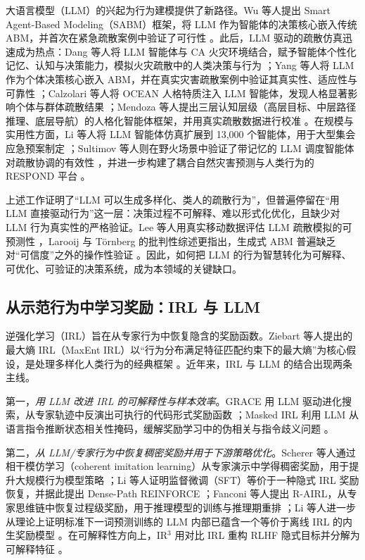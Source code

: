 \documentclass[UTF8,zihao=-4]{ctexart}
\begin{document}
大语言模型（LLM）的兴起为行为建模提供了新路径。Wu 等人提出 Smart Agent-Based Modeling（SABM）框架，将 LLM 作为智能体的决策核心嵌入传统 ABM，并首次在紧急疏散案例中验证了可行性 \cite{wu2023sabm}。此后，LLM 驱动的疏散仿真迅速成为热点：Dang 等人将 LLM 智能体与 CA 火灾环境结合，赋予智能体个性化记忆、认知与决策能力，模拟火灾疏散中的人类决策与行为 \cite{dang2025llmfire}；Yang 等人将 LLM 作为个体决策核心嵌入 ABM，并在真实灾害疏散案例中验证其真实性、适应性与可靠性 \cite{yang2026think}；Calzolari 等人将 OCEAN 人格特质注入 LLM 智能体，发现人格显著影响个体与群体疏散结果 \cite{calzolari2026personality}；Mendoza 等人提出三层认知层级（高层目标、中层路径推理、底层导航）的人格化智能体框架，并用真实疏散数据进行校准 \cite{mendoza2026hierarchical}。在规模与实用性方面，Li 等人将 LLM 智能体仿真扩展到 13{,}000 个智能体，用于大型集会应急预案制定 \cite{li2025policy}；Sultimov 等人则在野火场景中验证了带记忆的 LLM 调度智能体对疏散协调的有效性 \cite{sultimov2026llmguided}，并进一步构建了耦合自然灾害预测与人类行为的 RESPOND 平台 \cite{sultimov2026respond}。

上述工作证明了“LLM 可以生成多样化、类人的疏散行为”，但普遍停留在“用 LLM 直接驱动行为”这一层：决策过程不可解释、难以形式化优化，且缺少对 LLM 行为真实性的严格验证。Lee 等人用真实移动数据评估 LLM 疏散模拟的可预测性 \cite{lee2025predictability}，Larooij 与 T\"ornberg 的批判性综述更指出，生成式 ABM 普遍缺乏对“可信度”之外的操作性验证 \cite{larooij2025critical}。因此，如何把 LLM 的行为智慧转化为可解释、可优化、可验证的决策系统，成为本领域的关键缺口。

\subsection{从示范行为中学习奖励：IRL 与 LLM}

逆强化学习（IRL）旨在从专家行为中恢复隐含的奖励函数。Ziebart 等人提出的最大熵 IRL（MaxEnt IRL）以“行为分布满足特征匹配约束下的最大熵”为核心假设，是处理多样化人类行为的经典框架 \cite{ziebart2008maxent}。近年来，IRL 与 LLM 的结合出现两条主线。

第一，\emph{用 LLM 改进 IRL 的可解释性与样本效率}。GRACE 用 LLM 驱动进化搜索，从专家轨迹中反演出可执行的代码形式奖励函数 \cite{sapora2025grace}；Masked IRL 利用 LLM 从语言指令推断状态相关性掩码，缓解奖励学习中的伪相关与指令歧义问题 \cite{hwang2026maskedirl}。

第二，\emph{从 LLM/专家行为中恢复稠密奖励并用于下游策略优化}。Scherer 等人通过相干模仿学习（coherent imitation learning）从专家演示中学得稠密奖励，用于提升大规模行为模型策略 \cite{scherer2026csil}；Li 等人证明监督微调（SFT）等价于一种隐式 IRL 奖励恢复，并据此提出 Dense-Path REINFORCE \cite{li2025beyond}；Fanconi 等人提出 R-AIRL，从专家思维链中恢复过程级奖励，用于推理模型的训练与推理期重排 \cite{fanconi2025rairl}；Li 等人进一步从理论上证明标准下一词预测训练的 LLM 内部已蕴含一个等价于离线 IRL 的内生奖励模型 \cite{li2025generalist}。在可解释性方向上，IR$^3$ 用对比 IRL 重构 RLHF 隐式目标并分解为可解释特征 \cite{beigi2026ir3}。
\end{document}

